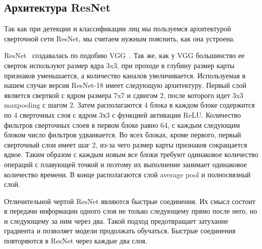 \subsection{Архитектура ResNet}\label{subsec:архитектура-resnet}
Так как при детекции и классификации лиц мы пользуемся архитектурой сверточной сети ResNet, мы считаем нужным пояснить, как она устроена.
\par ResNet~\cite{resnet} создавалась по подобию VGG~\cite{vgg}.
Так же, как у VGG большинство ее сверток используют размер ядра 3x3, при проходе в глубину размер карты признаков уменьшается, а количество каналов увеличивается.
Используемая в нашем случае версия ResNet-18 имеет следующую архитектуру.
Первый слой является сверткой с ядром размера 7x7 и сдвигом 2, после которого идет 3x3 maxpooling с шагом 2.
Затем располагаются 4 блока в каждом блоке содержится по 4 сверточных слоя с ядром 3х3 с функцией активации ReLU\@.
Количество фильтров сверточных слоев в первом блоке равно 64, с каждым следующим блоком число фильтров удваивается.
Во всех блоках, кроме первого, первый сверточный слои имеет шаг 2, из-за чего размер карты признаков сокращается вдвое.
Таким образом с каждым новым все блоки требуют одинаковое количество операций с плавующей точкой и поэтому их выполнение занимает одинаковое количество времени.
В конце располагаются слой average pool и полносвязный слой.
\par Отличительной чертой ResNet являются быстрые соединения.
Их смысл состоит в передачи информации одного слоя не только следующему прямо после него, но и следующему за ним через два.
Такой подход предотвращает затухание градиента и позволяет модели продолжать обучаться.
Быстрые соединения повторяются в ResNet через каждые два слоя.

